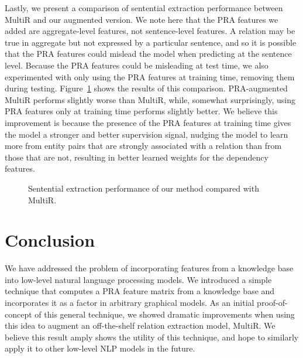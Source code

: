 \documentclass[11pt,a4paper]{article}
\newcommand{\figref}[1]{Figure~\ref{fig:#1}}
\begin{document}
Lastly, we present a comparison of sentential extraction performance between
MultiR and our augmented version.  We note here that the PRA features we added
are aggregate-level features, not sentence-level features.  A relation may be
true in aggregate but not expressed by a particular sentence, and so it is
possible that the PRA features could mislead the model when predicting at the
sentence level.  Because the PRA features could be misleading at test time, we
also experimented with only using the PRA features at training time, removing
them during testing.  \figref{sentential-comparison} shows the results of this
comparison.  PRA-augmented MultiR performs slightly worse than MultiR, while,
somewhat surprisingly, using PRA features only at training time performs
slightly better.  We believe this improvement is because the presence of the
PRA features at training time gives the model a stronger and better supervision
signal, nudging the model to learn more from entity pairs that are strongly
associated with a relation than from those that are not, resulting in better
learned weights for the dependency features.

\begin{figure}
  \centering
  \caption{Sentential extraction performance of our method compared with
  MultiR.}
  \label{fig:sentential-comparison}
\end{figure}

\section{Conclusion}

We have addressed the problem of incorporating features from a knowledge base
into low-level natural language processing models.  We introduced a simple
technique that computes a PRA feature matrix from a knowledge base and
incorporates it as a factor in arbitrary graphical models.  As an initial
proof-of-concept of this general technique, we showed dramatic improvements
when using this idea to augment an off-the-shelf relation extraction model,
MultiR.  We believe this result amply shows the utility of this technique, and
hope to similarly apply it to other low-level NLP models in the future.



\end{document}

